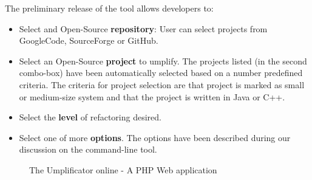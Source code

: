 The preliminary release of the tool allows developers to:

\begin{itemize}
\item Select and Open-Source \textbf{repository}: User can select projects from GoogleCode, SourceForge or GitHub.
\item Select an Open-Source \textbf{project} to umplify. The projects listed (in the second combo-box) have been automatically selected based on a number predefined criteria. The criteria for project selection are that project is marked as small or medium-size system and that the project is written in Java or C++.
\item Select the \textbf{level} of refactoring desired.
\item Select one of more \textbf{options}. The options have been described during our discussion on the command-line tool.
\end{itemize}

\begin{figure}[h]
\centering
{}
\caption{The Umplificator online - A PHP Web application}
\label{fig:umpleonline}
\end{figure}


